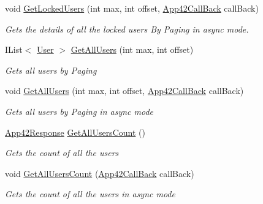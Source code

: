 \begin{DoxyCompactItemize}
void \hyperlink{classcom_1_1shephertz_1_1app42_1_1paas_1_1sdk_1_1csharp_1_1user_1_1_user_service_a2c6030b7ca9bc390d18752319c51457b}{Get\+Locked\+Users} (int max, int offset, \hyperlink{interfacecom_1_1shephertz_1_1app42_1_1paas_1_1sdk_1_1csharp_1_1_app42_call_back}{App42\+Call\+Back} call\+Back)
\begin{DoxyCompactList}\small\item\em Gets the details of all the locked users By Paging in async mode. \end{DoxyCompactList}\item 
I\+List$<$ \hyperlink{classcom_1_1shephertz_1_1app42_1_1paas_1_1sdk_1_1csharp_1_1user_1_1_user}{User} $>$ \hyperlink{classcom_1_1shephertz_1_1app42_1_1paas_1_1sdk_1_1csharp_1_1user_1_1_user_service_a73204c7230fd4df331c0e55ce97c1f4f}{Get\+All\+Users} (int max, int offset)
\begin{DoxyCompactList}\small\item\em Gets all users by Paging \end{DoxyCompactList}\item 
void \hyperlink{classcom_1_1shephertz_1_1app42_1_1paas_1_1sdk_1_1csharp_1_1user_1_1_user_service_a1d0e1f1b94ab07638c2f647ee77f30e1}{Get\+All\+Users} (int max, int offset, \hyperlink{interfacecom_1_1shephertz_1_1app42_1_1paas_1_1sdk_1_1csharp_1_1_app42_call_back}{App42\+Call\+Back} call\+Back)
\begin{DoxyCompactList}\small\item\em Gets all users by Paging in async mode \end{DoxyCompactList}\item 
\hyperlink{classcom_1_1shephertz_1_1app42_1_1paas_1_1sdk_1_1csharp_1_1_app42_response}{App42\+Response} \hyperlink{classcom_1_1shephertz_1_1app42_1_1paas_1_1sdk_1_1csharp_1_1user_1_1_user_service_a1610d438f5da5a7a6b2ee8cf11ba2425}{Get\+All\+Users\+Count} ()
\begin{DoxyCompactList}\small\item\em Gets the count of all the users \end{DoxyCompactList}\item 
void \hyperlink{classcom_1_1shephertz_1_1app42_1_1paas_1_1sdk_1_1csharp_1_1user_1_1_user_service_aab9ac6333bf8b17f7881e6ffda3ed13e}{Get\+All\+Users\+Count} (\hyperlink{interfacecom_1_1shephertz_1_1app42_1_1paas_1_1sdk_1_1csharp_1_1_app42_call_back}{App42\+Call\+Back} call\+Back)
\begin{DoxyCompactList}\small\item\em Gets the count of all the users in async mode \end{DoxyCompactList}\item 

\end{DoxyCompactItemize}
